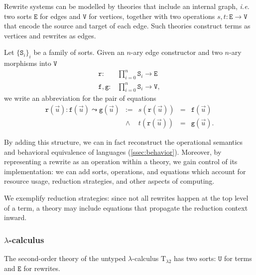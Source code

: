 \documentclass[12pt]{article}
\theoremstyle{definition}
\newcommand{\mrm}[1]{\mathrm{#1}}
\newcommand{\mtt}[1]{\mathtt{#1}}
\newcommand{\T}{\mrm{T}}
\newcommand{\tts}{\mtt{S}}
\newcommand{\ttu}{\mtt{U}}
\newcommand{\ttf}{\mtt{f}}
\newcommand{\ttg}{\mtt{g}}
\begin{document}
Rewrite systems can be modelled by theories that include an internal graph, {\em i.e.} two sorts $\mtt{E}$ for edges and $\mtt{V}$ for vertices, together with two operations $s,t\colon \mtt{E} \to \mtt{V}$ that encode the source and target of each edge.  Such theories construct terms as vertices and rewrites as edges.

Let $\{\tts_i\}_i$ be a family of sorts.  Given an $n$-ary edge constructor and two $n$-ary morphisms into $\mtt{V}$
\[\begin{array}{rl}
    \mtt{r}: & \prod_{i=0}^n \tts_i \to \mtt{E}\\
    \ttf,\ttg: & \prod_{i=0}^n \tts_i \to \mtt{V},
\end{array}\]
we write an abbreviation for the pair of equations
\[\begin{array}{lcccl}
    \mtt{r}(\vec{u}): \ttf(\vec{u}) \leadsto \ttg(\vec{u}) & := &
     s(\mtt{r}(\vec{u})) & = & \ttf(\vec{u})\\
     & \land & t(\mtt{r}(\vec{u})) & = & \ttg(\vec{u}).
\end{array}\]

By adding this structure, we can in fact reconstruct the operational semantics and behavioral equivalence of languages (\ref{ssec:behavior}). Moreover, by representing a rewrite as an operation within a theory, we gain control of its implementation: we can add sorts, operations, and equations which account for resource usage, reduction strategies, and other aspects of computing.

We exemplify reduction strategies: since not all rewrites happen at the top level of a term, a theory may include equations that propagate the reduction context inward.

\subsubsection{$\lambda$-calculus}
\label{lambdacalc}

The second-order theory of the untyped $\lambda$-calculus $\T_{\lambda 2}$ has two sorts: $\ttu$ for terms and $\mtt{E}$ for rewrites.
\end{document}
